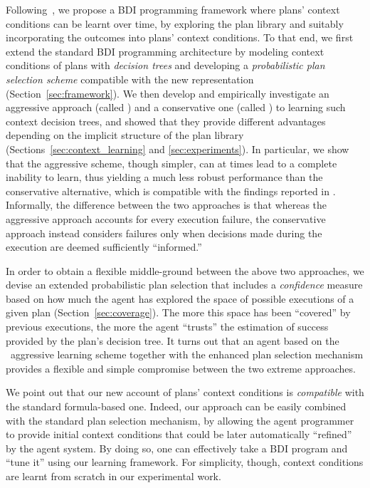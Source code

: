 Following~\cite{Airiau:IJAT09}, we propose a BDI programming framework where plans'
context conditions can be learnt over time, by exploring the plan library and
suitably incorporating the outcomes into plans' context conditions.
To that end, we first extend the standard BDI programming architecture by
modeling context conditions of plans with \emph{decision trees}
\cite{Mitchell97:ML} and developing a \emph{probabilistic plan selection scheme}
compatible with the new representation (Section~\ref{sec:framework}). %
We then  develop and empirically investigate an aggressive approach (called \CL) and a
conservative one (called \BUL) to learning such context decision trees, and
showed that they provide different advantages depending on the implicit structure
of the plan library (Sections~\ref{sec:context_learning} and
\ref{sec:experiments}). In particular, we show that the aggressive scheme, though simpler, can at times lead to a complete inability to learn, thus yielding a much less robust performance than the conservative alternative, which is compatible with the findings reported in \cite{Airiau:IJAT09}.
Informally, the difference between the two approaches is that whereas the
aggressive approach accounts for every execution failure, the conservative
approach instead considers failures only when decisions made during the execution
are deemed sufficiently ``informed.''


In order to obtain a flexible middle-ground between the above two approaches, we
devise an extended probabilistic plan selection that includes a \emph{confidence}
measure based on how much the agent has explored the space of possible
executions of a given plan (Section~\ref{sec:coverage}). The more this space has
been ``covered'' by previous executions, the more the agent ``trusts'' the
estimation of success provided by the plan's decision tree.
It turns out that an agent based on the \CL\ aggressive learning scheme together
with the enhanced plan selection mechanism provides a flexible and simple
compromise between the two extreme approaches.



We point out that our new account of plans' context conditions is
\emph{compatible} with the standard formula-based one.
Indeed, our approach can be easily combined with the standard plan selection
mechanism, by allowing the agent programmer to provide initial context conditions
that could be later automatically ``refined'' by the agent system. By doing so,
one can effectively take a BDI program and ``tune it'' using our learning
framework.
For simplicity, though, context conditions are learnt from scratch in our
experimental work.





